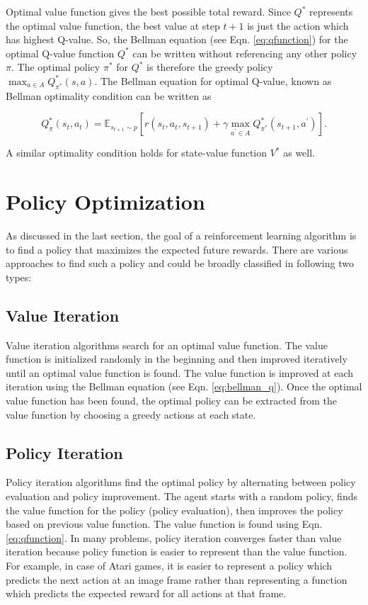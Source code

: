 Optimal value function gives the best possible total reward. Since $Q^*$ represents the optimal value function, the best value at step $t+1$ is just the action which has highest Q-value. So, the Bellman equation (see Eqn. \ref{eq:qfunction}) for the optimal Q-value function $Q^*$ can be written without referencing any other policy $\pi$. The optimal policy $\pi^*$ for $Q^*$ is therefore the greedy policy $\max_{a\in A} Q^*_{\pi^*}(s, a)$. The Bellman equation for optimal Q-value, known as Bellman optimality condition can be written as

\begin{equation}\label{eq:bellman_v}
Q^*_\pi(s_t, a_t) = \mathbb{E}_{s_{t+1}\sim p}[r(s_t,a_t,s_{t+1}) + \gamma \max_{a^\prime \in A} Q^*_{\pi^*}(s_{t+1}, a^\prime)].
\end{equation}

A similar optimality condition holds for state-value function $V^*$ as well.

\newpage
\section{Policy Optimization}

As discussed in the last section, the goal of a reinforcement learning algorithm is to find a policy that maximizes the expected future rewards. There are various approaches to find such a policy and could be broadly classified in following two types:

\subsection{Value Iteration}
Value iteration algorithms search for an optimal value function. The value function is initialized randomly in the beginning and then improved iteratively until an optimal value function is found. The value function is improved at each iteration using the Bellman equation (see Eqn. \ref{eq:bellman_q}). Once the optimal value function has been found, the optimal policy can be extracted from the value function by choosing a greedy actions at each state. 

\subsection{Policy Iteration}
Policy iteration algorithms find the optimal policy by alternating between policy evaluation and policy improvement. The agent starts with a random policy, finds the value function for the policy (policy evaluation), then improves the policy based on previous value function. The value function is found using Eqn. \ref{eq:qfunction}. In many problems, policy iteration converges faster than value iteration because policy function is easier to represent than the value function. For example, in case of Atari games, it is easier to represent a policy which predicts the next action at an image frame rather than representing a function which predicts the expected reward for all actions at that frame.

